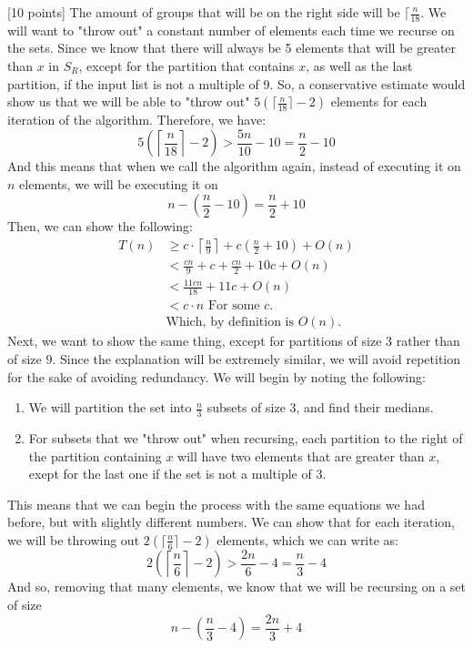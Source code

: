 \documentclass[12pt]{article}
\newcounter{ques}
\newenvironment{question}{\stepcounter{ques}{\noindent\bf Question \arabic{ques}:}}{\vspace{5mm}}
\begin{document}
\begin{question}[10 points]
The amount of groups that will be on the right side will be $\lceil\frac{n}{18}$.
We will want to "throw out" a constant number of elements each time we recurse on the sets. Since we know that there will always be 5 elements that will be greater than $x$ in $S_R$, except for the partition that contains $x$, as well as the last partition, if the input list is not a multiple of 9. So, a conservative estimate would show us that we will be able to "throw out" $5(\lceil\frac{n}{18}\rceil-2)$ elements for each iteration of the algorithm. Therefore, we have:
$$5(\left\lceil\frac{n}{18}\right\rceil-2)>\frac{5n}{10}-10=\frac{n}{2}-10$$
And this means that when we call the algorithm again, instead of executing it on $n$ elements, we will be executing it on
$$n-\left(\frac{n}{2}-10\right)=\frac{n}{2}+10$$
Then, we can show the following:
\begin{align*}
  T(n) &\geq c\cdot\left\lceil\frac{n}{9}\right\rceil + c\left(\frac{n}{2}+10\right)+O(n)\\
       &< \frac{cn}{9} + c + \frac{cn}{2} + 10c + O(n)\\
       &< \frac{11cn}{18} + 11c + O(n)\\
       &< c\cdot n \text{    For some $c$.}\\
       &  \text{Which, by definition is } O(n).
\end{align*}
Next, we want to show the same thing, except for partitions of size $3$ rather than of size $9$. Since the explanation will be extremely similar, we will avoid repetition for the sake of avoiding redundancy. We will begin by noting the following:\\
\begin{enumerate}
  \item We will partition the set into $\frac{n}{3}$ subsets of size $3$, and find their medians.
  \item For subsets that we "throw out" when recursing, each partition to the right of the partition containing $x$ will have two elements that are greater than $x$, exept for the last one if the set is not a multiple of 3.
\end{enumerate}
This means that we can begin the process with the same equations we had before, but with slightly different numbers. We can show that for each iteration, we will be throwing out $2(\lceil\frac{n}{6}\rceil-2)$ elements, which we can write as:
$$2(\left\lceil\frac{n}{6}\right\rceil-2)>\frac{2n}{6}-4=\frac{n}{3}-4$$
And so, removing that many elements, we know that we will be recursing on a set of size
$$n-(\frac{n}{3}-4)=\frac{2n}{3}+4$$

\end{question}
\end{document}
